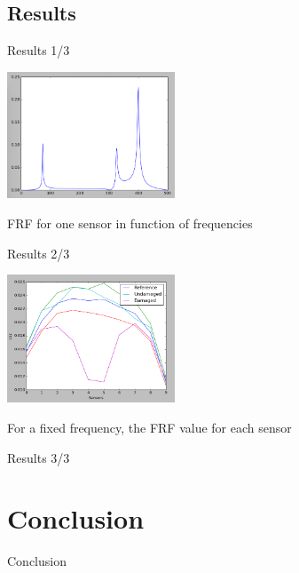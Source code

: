 \documentclass{beamer}
\begin{document}
\subsection{Results}
\begin{frame}{Results 1/3}
\begin{center}
\includegraphics[width=5cm]{images/FRF_freq.png}

FRF for one sensor in function of frequencies
\end{center}
\end{frame}


\begin{frame}{Results 2/3}
\begin{center}
\includegraphics[width=5cm]{images/curve_damage.png}

For a fixed frequency, the FRF value for each sensor
\end{center}

\end{frame}


\begin{frame}{Results 3/3}
\end{frame}



\section{Conclusion}

\begin{frame}{Conclusion}
\end{frame}


  
\end{document}
